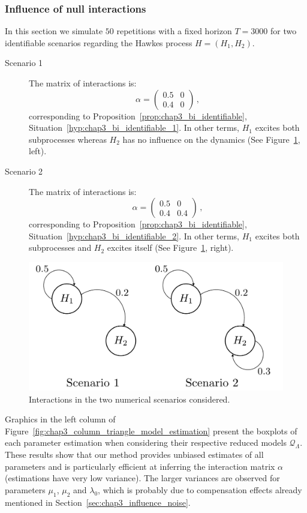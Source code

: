 		
		\subsubsection{Influence of null interactions}
		\label{sec:chap3_bi_two_scenarios}

        In this section we simulate $50$ repetitions with a fixed horizon $T=3000$ for two identifiable scenarios regarding the Hawkes process $H = (H_1, H_2)$.
        \begin{description}
          \item[Scenario 1] The matrix of interactions is:
          \[
            \alpha = \begin{pmatrix} 0.5 & 0 \\ 0.4 & 0 \end{pmatrix}\,,
          \]
          corresponding to Proposition~\ref{prop:chap3_bi_identifiable}, Situation~\ref{hyp:chap3_bi_identifiable_1}.
          In other terms, $H_1$ excites both subprocesses whereas $H_2$ has no influence on the dynamics (See Figure~\ref{fig:chap3_bi_scenario}, left).
          \item[Scenario 2] The matrix of interactions is:
          \[
            \alpha = \begin{pmatrix} 0.5 & 0 \\ 0.4 & 0.4 \end{pmatrix}\,,
          \]
          corresponding to Proposition~\ref{prop:chap3_bi_identifiable}, Situation~\ref{hyp:chap3_bi_identifiable_2}.
          In other terms, $H_1$ excites both subprocesses and $H_2$ excites itself (See Figure~\ref{fig:chap3_bi_scenario}, right).
        \end{description}
        		
        \begin{figure}[!ht]
  			\centering
			  \includegraphics[width=0.5\linewidth]{images/chapter4//bivariate_spectral_hawkes.pdf}
 		   	\caption{
 		   	Interactions in the two numerical scenarios considered.
 		   	}
 		  	\label{fig:chap3_bi_scenario}
	   	\end{figure}

      Graphics in the left column of Figure~\ref{fig:chap3_column_triangle_model_estimation} present the boxplots of each parameter estimation when considering their respective reduced models $\mathcal{Q}_{\Lambda}$.		
      These results show that our method provides unbiased estimates of all parameters and is particularly efficient at inferring the interaction matrix $\alpha$ (estimations have very low variance).
      The larger variances are observed for parameters $\mu_1$, $\mu_2$ and $\lambda_0$, which is probably due to compensation effects already mentioned in Section~\ref{sec:chap3_influence_noise}.

